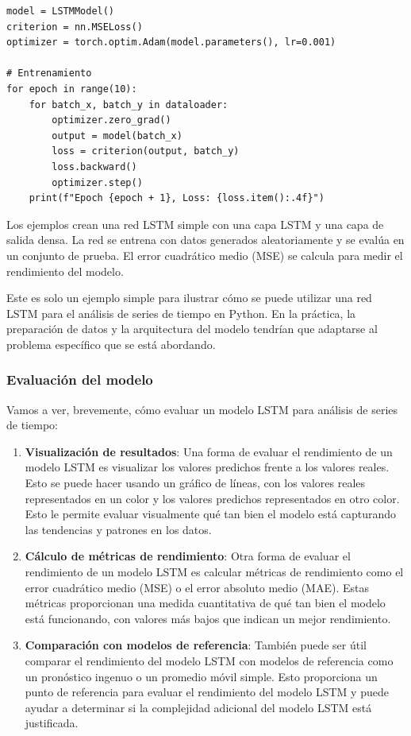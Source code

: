 \documentclass[11pt]{article}
\begin{document}
\begin{itemize}
\begin{verbatim}
model = LSTMModel()
criterion = nn.MSELoss()
optimizer = torch.optim.Adam(model.parameters(), lr=0.001)

# Entrenamiento
for epoch in range(10):
    for batch_x, batch_y in dataloader:
        optimizer.zero_grad()
        output = model(batch_x)
        loss = criterion(output, batch_y)
        loss.backward()
        optimizer.step()
    print(f"Epoch {epoch + 1}, Loss: {loss.item():.4f}")
\end{verbatim}


Los ejemplos crean una red LSTM simple con una capa LSTM y una capa de
salida densa. La red se entrena con datos generados aleatoriamente y
se evalúa en un conjunto de prueba. El error cuadrático medio (MSE) se
calcula para medir el rendimiento del modelo.

Este es solo un ejemplo simple para ilustrar cómo se puede utilizar
una red LSTM para el análisis de series de tiempo en Python. En la
práctica, la preparación de datos y la arquitectura del modelo
tendrían que adaptarse al problema específico que se está abordando.
\end{itemize}

\subsubsection{Evaluación del modelo}
\label{sec:org89eb3a0}
Vamos a ver, brevemente, cómo evaluar un modelo LSTM para análisis de
series de tiempo:

\begin{enumerate}
\item \textbf{\textbf{Visualización de resultados}}: Una forma de evaluar el
rendimiento de un modelo LSTM es visualizar los valores predichos
frente a los valores reales. Esto se puede hacer usando un gráfico
de líneas, con los valores reales representados en un color y los
valores predichos representados en otro color. Esto le permite
evaluar visualmente qué tan bien el modelo está capturando las
tendencias y patrones en los datos.

\item \textbf{\textbf{Cálculo de métricas de rendimiento}}: Otra forma de evaluar el
rendimiento de un modelo LSTM es calcular métricas de rendimiento
como el error cuadrático medio (MSE) o el error absoluto medio
(MAE). Estas métricas proporcionan una medida cuantitativa de qué
tan bien el modelo está funcionando, con valores más bajos que
indican un mejor rendimiento.

\item \textbf{\textbf{Comparación con modelos de referencia}}: También puede ser útil
comparar el rendimiento del modelo LSTM con modelos de referencia
como un pronóstico ingenuo o un promedio móvil simple. Esto
proporciona un punto de referencia para evaluar el rendimiento del
modelo LSTM y puede ayudar a determinar si la complejidad adicional
del modelo LSTM está justificada.
\end{enumerate}
\end{document}
